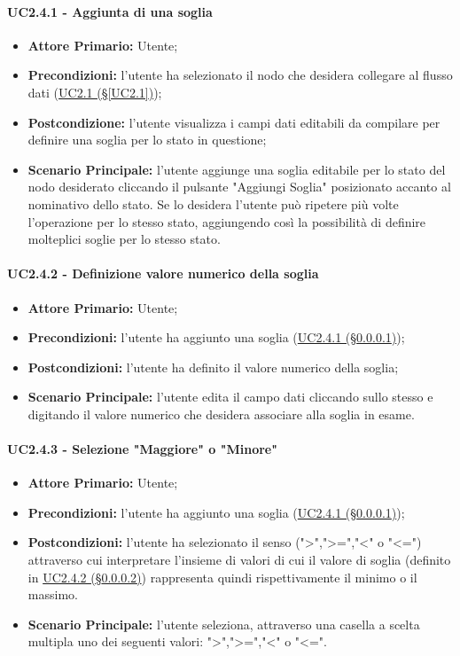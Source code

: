 \paragraph{UC2.4.1 - Aggiunta di una soglia}\label{UC2.4.1}
\begin{itemize}
	\item \textbf{Attore Primario:} Utente;
	\item \textbf{Precondizioni:} l'utente ha selezionato il nodo che desidera collegare al flusso dati 					(\hyperref[UC2.1]{UC2.1 (§\ref*{UC2.1})});
	\item \textbf{Postcondizione:} l'utente visualizza i campi dati editabili da compilare per definire una soglia per lo stato in questione;
	\item \textbf{Scenario Principale:} l'utente aggiunge una soglia editabile per lo stato del nodo desiderato cliccando il pulsante "Aggiungi Soglia" posizionato accanto al nominativo dello stato. Se lo desidera l'utente può ripetere più volte l'operazione per lo stesso stato, aggiungendo così la possibilità di definire molteplici soglie per lo stesso stato.
\end{itemize}

\paragraph{UC2.4.2 - Definizione valore numerico della soglia}\label{UC2.4.2}
\begin{itemize}
	\item \textbf{Attore Primario:} Utente;
	\item \textbf{Precondizioni:} l'utente ha aggiunto una soglia (\hyperref[UC2.4.1]{UC2.4.1 (§\ref*{UC2.4.1})});
	\item \textbf{Postcondizioni:} l'utente ha definito il valore numerico della soglia;
	\item \textbf{Scenario Principale:} l'utente edita il campo dati cliccando sullo stesso e digitando il valore numerico che desidera associare alla soglia in esame.
\end{itemize}

\paragraph{UC2.4.3 - Selezione "Maggiore" o "Minore"}\label{UC2.4.3}
\begin{itemize}
	\item \textbf{Attore Primario:} Utente;
	\item \textbf{Precondizioni:} l'utente ha aggiunto una soglia (\hyperref[UC2.4.1]{UC2.4.1 (§\ref*{UC2.4.1})});
	\item \textbf{Postcondizioni:} l'utente ha selezionato il senso (">",">=","<" o "<=") attraverso cui interpretare l'insieme di valori di cui il valore di soglia (definito in \hyperref[UC2.4.2]{UC2.4.2 (§\ref*{UC2.4.2})}) rappresenta quindi rispettivamente il minimo o il massimo.
	\item \textbf{Scenario Principale:} l'utente seleziona, attraverso una casella a scelta multipla uno dei seguenti valori: ">",">=","<" o "<=".
\end{itemize}


